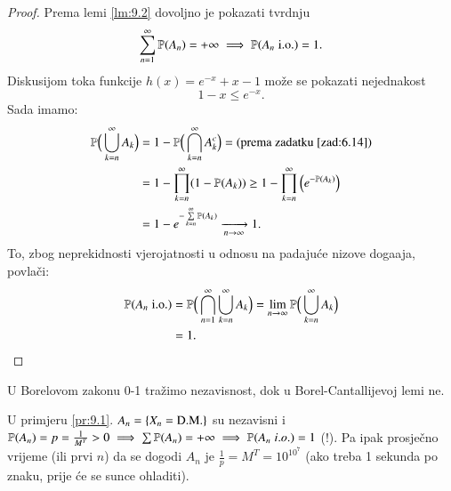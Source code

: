 \begin{proof}
    Prema lemi \ref{lm:9.2} dovoljno je pokazati tvrdnju
    \begin{equation*}
        \sum\limits_{n = 1}^{\infty} \mathbb{P}({A_n}) = + \infty \implies \mathbb{P}({A_n \; \mathrm{i.o.}}) = 1.
    \end{equation*}
    Diskusijom toka funkcije $h(x) = e^{-x} + x - 1$ mo\v ze se pokazati nejednakost
    \begin{equation*}
        1 - x \leq e^{-x}.
    \end{equation*}
    Sada imamo:
    \begin{equation*}
        \begin{aligned}
            \mathbb{P} \Big(\bigcup\limits_{k = n}^{\infty} A_k \Big) &= 1 - \mathbb{P} \Big( \bigcap\limits_{k = n}^{\infty} A_k^c \Big) = (\textnormal{prema zadatku \ref{zad:6.14}})\\
            &= 1 - \prod\limits_{k = n}^{\infty} (1 - \mathbb{P}({A_k})) \geq 1 - \prod\limits_{k = n}^{\infty} \Big( e^{- \mathbb{P} (A_k)} \Big)\\
            &= 1 - e^{- \sum\limits_{k = n}^{\infty} \mathbb{P}({A_k})} \xrightarrow[n \to \infty]{} 1.
        \end{aligned}
    \end{equation*}
    To, zbog neprekidnosti vjerojatnosti u odnosu na padaju\' ce nizove doga\dj aja, povla\v ci:
    \begin{equation*}
        \begin{aligned}
            \mathbb{P} ( A_n \; \mathrm{i.o.} ) &= \mathbb{P} \Big( \bigcap\limits_{n = 1}^{\infty} \bigcup\limits_{k = n}^{\infty} A_k \Big) = \lim\limits_{n \to \infty} \mathbb{P} \Big( \bigcup\limits_{k = n}^{\infty} A_k \Big)\\
            &= 1.
        \end{aligned}
    \end{equation*}
\end{proof}

\begin{nap} \label{nap:9.3-1}
    U Borelovom zakonu 0-1 tra\v zimo nezavisnost, dok u Borel-Cantallijevoj lemi ne.
\end{nap}

\begin{nap} \label{nap:9.4}
    U primjeru \ref{pr:9.1}. $A_n = \{ X_n = \textnormal{D.M.} \}$ su nezavisni i $\mathbb{P}({A_n}) = p = \frac{1}{M^T} > 0 \implies \sum \mathbb{P}({A_n}) = +\infty \implies \mathbb{P}({A_n \; i.o.}) = 1$ (!).
    Pa ipak prosje\v cno vrijeme (ili prvi $n$) da se dogodi $A_n$ je $\frac{1}{p} = M^T = 10^{10^7}$ (ako treba 1 sekunda po znaku, prije \' ce se sunce ohladiti).
\end{nap}

